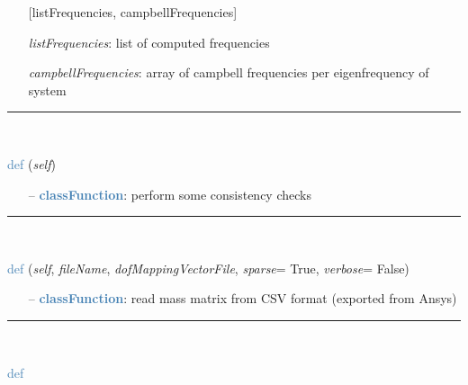 \begin{itemize}[leftmargin=1.4cm]
\begin{itemize}[leftmargin=1.4cm]
\begin{itemize}[leftmargin=0.5cm]
\begin{itemize}[leftmargin=1.4cm]
\begin{itemize}[leftmargin=1.4cm]
\begin{itemize}[leftmargin=0.5cm]
\begin{itemize}[leftmargin=0.7cm]
  \begin{itemize}[leftmargin=1.2cm]
\setlength{\itemindent}{-0.7cm}
    \item[] [listFrequencies, campbellFrequencies]
    \item[] {\it   listFrequencies}: list of computed frequencies
    \item[] {\it   campbellFrequencies}: array of campbell frequencies per eigenfrequency of system
  \end{itemize}
\vspace{12pt}\end{itemize}
%
\noindent\rule{8cm}{0.75pt}\vspace{1pt} \\ 
\begin{flushleft}
\noindent \textcolor{steelblue}{def {\bf {}}}\label{sec:FEM:FEMinterface:CheckConsistency}
({\it self})
\end{flushleft}
\setlength{\itemindent}{0.7cm}
\begin{itemize}[leftmargin=0.7cm]
  \item[--]  \textcolor{steelblue}{\bf classFunction}: perform some consistency checks\vspace{12pt}\end{itemize}
%
\noindent\rule{8cm}{0.75pt}\vspace{1pt} \\ 
\begin{flushleft}
\noindent \textcolor{steelblue}{def {\bf {}}}\label{sec:FEM:FEMinterface:ReadMassMatrixFromAnsys}
({\it self}, {\it fileName}, {\it dofMappingVectorFile}, {\it sparse}= True, {\it verbose}= False)
\end{flushleft}
\setlength{\itemindent}{0.7cm}
\begin{itemize}[leftmargin=0.7cm]
  \item[--]  \textcolor{steelblue}{\bf classFunction}: read mass matrix from CSV format (exported from Ansys)\vspace{12pt}\end{itemize}
%
\noindent\rule{8cm}{0.75pt}\vspace{1pt} \\ 
\begin{flushleft}
\noindent \textcolor{steelblue}{def {\bf {}}}\label{sec:FEM:FEMinterface:ReadStiffnessMatrixFromAnsys}

\end{flushleft}
\end{itemize}
\end{itemize}
\end{itemize}
\end{itemize}
\end{itemize}
\end{itemize}

